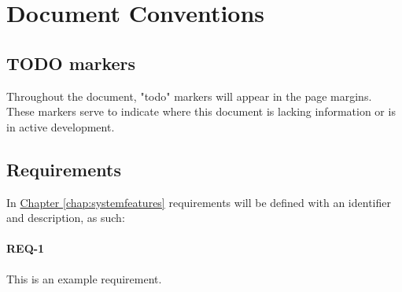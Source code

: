 \section{Document Conventions}\label{sec:documentconventions}

\subsection{TODO markers}
Throughout the document, "todo" markers will appear in the page margins. These
markers serve to indicate where this document is lacking information or is
in active development.



\subsection{Requirements}
In \hyperref[chap:systemfeatures]{Chapter \ref{chap:systemfeatures}}
requirements will be defined with an identifier and description, as such:

\paragraph{REQ-1}
\begin{indentpar}{1cm}
This is an example requirement.
\end{indentpar}


